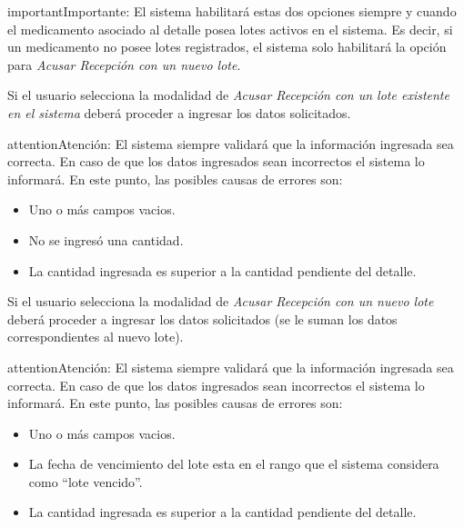 \documentclass[a4paper,10pt,spanish]{sphinxmanual}
\begin{document}
\begin{notice}{important}{Importante:}
El sistema habilitará estas dos opciones siempre y cuando el medicamento asociado al detalle posea lotes activos en el sistema. Es decir, si un medicamento no posee lotes registrados, el sistema solo habilitará la opción para \emph{Acusar Recepción con un nuevo lote}.
\end{notice}

Si el usuario selecciona la modalidad de \emph{Acusar Recepción con un lote existente en el sistema} deberá proceder a ingresar los datos solicitados.

\begin{notice}{attention}{Atención:}
El sistema siempre validará que la información ingresada sea correcta. En caso de que los datos ingresados sean incorrectos el sistema lo informará.
En este punto, las posibles causas de errores son:
\begin{itemize}
\item {} 
Uno o más campos vacios.

\item {} 
No se ingresó una cantidad.

\item {} 
La cantidad ingresada es superior a la cantidad pendiente del detalle.

\end{itemize}
\end{notice}

Si el usuario selecciona la modalidad de \emph{Acusar Recepción con un nuevo lote} deberá proceder a ingresar los datos solicitados (se le suman los datos correspondientes al nuevo lote).

\begin{notice}{attention}{Atención:}
El sistema siempre validará que la información ingresada sea correcta. En caso de que los datos ingresados sean incorrectos el sistema lo informará.
En este punto, las posibles causas de errores son:
\begin{itemize}
\item {} 
Uno o más campos vacios.

\item {} 
La fecha de vencimiento del lote esta en el rango que el sistema considera como ``lote vencido''.

\item {} 
La cantidad ingresada es superior a la cantidad pendiente del detalle.

\end{itemize}
\end{notice}
\end{document}
